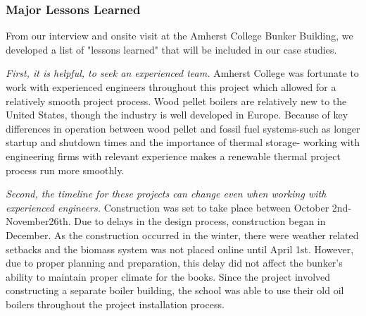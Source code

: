 \subsubsection{Major Lessons Learned}
\par From our interview and onsite visit at the Amherst College Bunker Building, we developed a list of "lessons learned" that will be included in our case studies. 
\par \emph{First, it is helpful,  to seek an experienced team.} Amherst College was fortunate to work with experienced engineers throughout this project which allowed for a relatively smooth project process. Wood pellet boilers are relatively new to the United States, though the industry is well developed in Europe. Because of key differences in operation between wood pellet and fossil fuel systems-such as longer startup and shutdown times and the importance of thermal storage- working with engineering firms with relevant experience makes a renewable thermal project process run more smoothly.
\par \emph{Second, the timeline for these projects can change even when working with experienced engineers.} Construction was set to take place between October 2nd-November26th. Due to delays in the design process, construction began in December. As the construction occurred in the winter, there were weather related setbacks and the biomass system was not placed online until April 1st. However, due to proper planning and preparation, this delay did not affect the bunker’s ability to maintain proper climate for the books. Since the project involved constructing a separate boiler building, the school was able to use their old oil boilers throughout the project installation process.

